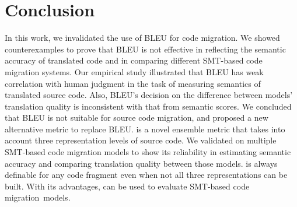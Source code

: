 \section{Conclusion}
In this work, we invalidated the use of BLEU for code migration. We
showed counterexamples to prove that BLEU is not effective in
reflecting the semantic accuracy of translated code and in comparing
different SMT-based code migration systems. Our empirical study
illustrated that BLEU has weak correlation with human judgment in the
task of measuring semantics of translated source code. Also, BLEU's
decision on the difference between models' translation quality is
inconsistent with that from semantic scores. We concluded that BLEU is
not suitable for source code migration, and proposed a new alternative
metric {\model} to replace BLEU. {\model} is a novel ensemble metric
that takes into account three representation levels of source code. We
validated {\model} on multiple SMT-based code migration models to show
its reliability in estimating semantic accuracy and comparing
translation quality between those models. {\model} is always definable
for any code fragment even when not all three representations can be
built. With its advantages, {\model} can be used to evaluate
SMT-based code migration~models.
